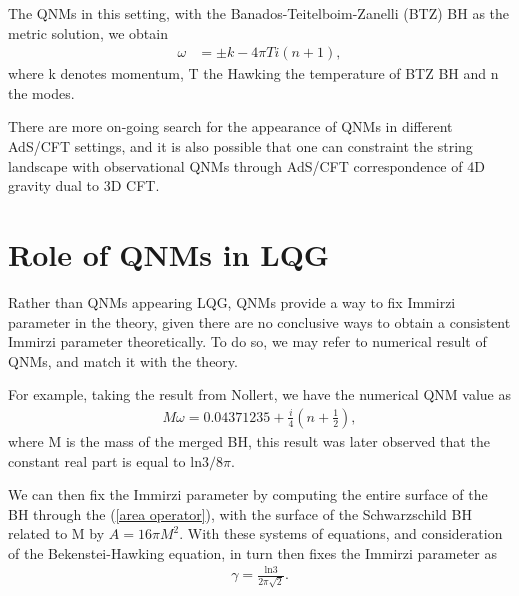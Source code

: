 \documentclass[a4paper, 12pt]{article}
\begin{document}
    The QNMs in this setting, with the Banados-Teitelboim-Zanelli
    (BTZ) BH
    as the metric solution\cite{karakasis2021black}, we obtain 
    \begin{align}
      \label{QNM in (2+1)}
      \omega &= \pm k - 4 \pi T i (n + 1), 
    \end{align} where k denotes momentum, T the Hawking
    the temperature of BTZ BH and n the modes. 

    There are more on-going search for the appearance of QNMs in
    different AdS/CFT settings, and it is also possible that one can
    constraint the string landscape with observational QNMs through
    AdS/CFT correspondence of 4D gravity dual to 3D CFT. 

    \section{Role of QNMs in LQG}%
      \label{sec:Appearance of QNMs in LQG}
   
    Rather than QNMs appearing LQG, QNMs provide a way to fix Immirzi
    parameter in the theory, given there are no conclusive ways to obtain
    a consistent Immirzi parameter theoretically. To do so, we may
    refer to numerical result of QNMs, and match it with the
    theory\cite{dreyer2003quasinormal}.

    For example, taking the result from
    Nollert\cite{nollert1999quasinormal}, we have the numerical QNM
    value as 
    \begin{align}
      \label{QNM nollert}
      M \omega = 0.04371235 + \frac{i}{4}(n + \frac{1}{2}), 
    \end{align} where M is the mass of the merged BH, this result was
    later observed that the constant real part is equal to \(
    \mathrm{ln}3 / 8\pi \).  
    
    We can then fix the Immirzi parameter by computing the entire surface
    of the BH through the (\ref{area operator}), with the surface of the
    Schwarzschild BH related to M by \( A = 16 \pi M^2 \). With these systems
    of equations, and consideration of the Bekenstei-Hawking
    equation, in turn then fixes the Immirzi parameter as 
    \begin{align}
      \label{immirzi fixed}
      \gamma = \frac{\mathrm{ln}3}{2 \pi \sqrt{2} }.
    \end{align}
\end{document}
